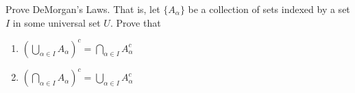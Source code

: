 \begin{comment}
	Now suppose that $x \in (A \cap B) \cup (A \cap C)$. Then $x \in A \cap B$ or $x \in A \cap C$. If $x \in A \cap B$, then $a \in A$ and $x \in B \subseteq B \cup C$ and so $x \in A \cap (B \cup C)$. Similarly, if $x \in A \cap C$, then $a \in A$ and $x \in C \subseteq B \cup C$ and so $x \in A \cap (B \cup C)$. Thus, $(A \cap B) \cup (A \cap C) \subseteq A \cap (B \cup C)$. The two containments show that $A \cap (B \cup C) = (A \cap B) \cup (A \cap C)$.
	
	\item Suppose that $x \in A \cup (B \cap C)$. Then $x \in A$ or $x \in B \cap C$. If $x \in A$, then $x \in A \cup B$ and $x \in A \cup C$ and $x \in (A \cup B) \cap (A \cup C)$. If $x \in B \cap C$,  then $x \in B \subseteq A \cup B$ and $x \in C \subseteq A \cup C$. So $x \in (A \cup B) \cap (A \cup C)$. We conclude that $A \cup (B \cap C) \subseteq (A \cup B) \cap (A \cup C)$.
	
	Now suppose that $x \in (A \cup B) \cap (A \cup C)$. Then $x \in A \cup B$ and $x \in A \cup C$. If $x \in A$, then $x \in A \cup (B \cap C)$. If $x \notin A$, then $x \in B$ and $x \in C$. So $x \in B \cap C \subseteq A \cup (B \cap C)$. It follows that $(A \cup B) \cap (A \cup C) \subseteq A \cup (B \cap C)$. The two containments show that $A \cup (B \cap C) = (A \cup B) \cap (A \cup C)$.
	
	\ea
	

\end{comment}

\item \label{ex:DeMorgan} Prove DeMorgan's Laws. That is, let $\{A_{\alpha}\}$ be a collection of sets indexed by a set $I$ in some universal set $U$. Prove that 
\begin{enumerate}
\item $\displaystyle \left(\bigcup_{\alpha \in I} A_{\alpha}\right)^c = \bigcap_{\alpha \in I} A_{\alpha}^c$ 
\item $\displaystyle \left(\bigcap_{\alpha \in I} A_{\alpha}\right)^c = \bigcup_{\alpha \in I} A_{\alpha}^c$ 
\end{enumerate}

